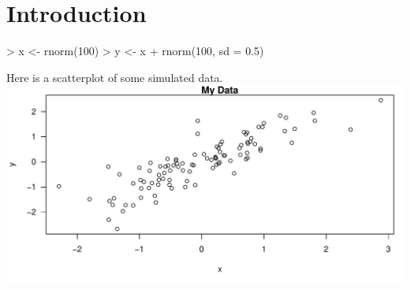 \documentclass[11pt]{article}
\begin{document}
\section{Introduction}
\begin{Schunk}
\begin{Sinput}
> x <- rnorm(100)
> y <- x + rnorm(100, sd = 0.5)
\end{Sinput}
\end{Schunk}

Here is a scatterplot of some simulated data.\\

\includegraphics{example6-scatterplot}
\end{document}
